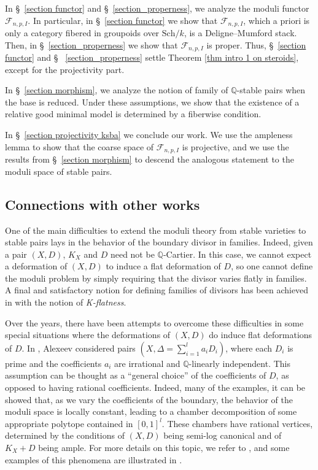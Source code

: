 \documentclass{amsart}
\newcommand{\bQ}{\mathbb{Q}}
\newcommand{\sF}{\mathscr{F}}
\theoremstyle{definition}
\begin{document}
In \S~\ref{section functor} and \S~\ref{section_properness}, we analyze the moduli functor $\sF_{n,p,I}$.
In particular, in \S~\ref{section functor} we show that $\sF_{n,p,I}$, which a priori is only a category fibered in groupoids over $\mathrm{Sch}/k$, is a Deligne--Mumford stack.
Then, in \S~\ref{section_properness} we show that $\sF_{n,p,I}$ is proper.
Thus, \S~\ref{section functor} and \S~ \ref{section_properness} settle Theorem \ref{thm intro 1 on steroids}, except for the projectivity part.

In \S~\ref{section morphism}, we analyze the notion of family of $\bQ$-stable pairs when the base is reduced.
Under these assumptions, we show that the existence of a relative good minimal model is determined by a fiberwise condition.

In \S~\ref{section projectivity ksba} we conclude our work.
We use the ampleness lemma to show that the coarse space of $\sF_{n,p,I}$ is projective, and we use the results from \S~\ref{section morphism} to descend the analogous statement to the moduli space of stable pairs.


\subsection{Connections with other works}
One of the main difficulties to extend the moduli theory from stable varieties to stable pairs lays in the behavior of the boundary divisor in families.
Indeed, given a pair $(X,D)$, $K_X$ and $D$ need not be $\mathbb Q$-Cartier.
In this case, we cannot expect a deformation of $(X,D)$ to induce a flat deformation of $D$, so one cannot define the moduli problem by simply requiring that the divisor varies flatly in families.
A final and satisfactory notion for defining families of divisors has been achieved in \cite{kol19s} with the notion of \textit{K-flatness}.

Over the years, there have been attempts to overcome these difficulties in some special situations where the deformations of $(X,D)$ do induce flat deformations of $D$.
In \cites{Ale06,Ale15}, Alexeev considered pairs $(X,\Delta=\sum_{i=1}^l a_i D_i)$, where each $D_i$ is prime and the coefficients $a_i$ are irrational and $\mathbb Q$-linearly independent.
This assumption can be thought as a ``general choice'' of the coefficients of $D$, as opposed to having rational coefficients.
Indeed, many of the examples, it can be showed that, as we vary the coefficients of the boundary, the behavior of the moduli space is locally constant, leading to a chamber decomposition of some appropriate polytope contained in $[0,1]^l$.
These chambers have rational vertices, determined by the conditions of $(X,D)$ being semi-log canonical and of $K_X+D$ being ample.
For more details on this topic, we refer to \cite{ABIP}, and some examples of this phenomena are illustrated in \cites{Ale15, inc20, AB21}.
\end{document}
